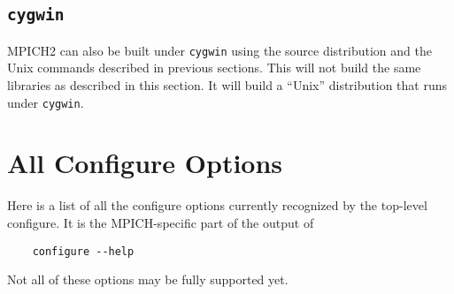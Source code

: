 \documentclass[dvipdfm,11pt]{article}
\begin{document}
\subsection{\texttt{cygwin}}
\label{sec:cygwin}

MPICH2 can also be built under \texttt{cygwin} using the source
distribution and the Unix commands described in previous sections.  This
will not build the same libraries as described in this section.  It will 
build a ``Unix'' distribution that runs under \texttt{cygwin}.

\section{All Configure Options}
\label{configure-options}
Here is a list of all the configure options currently recognized by the
top-level configure.  It is the MPICH-specific part of the output of 
\begin{verbatim}
    configure --help
\end{verbatim}
Not all of these options may be fully supported yet.  
\end{document}
